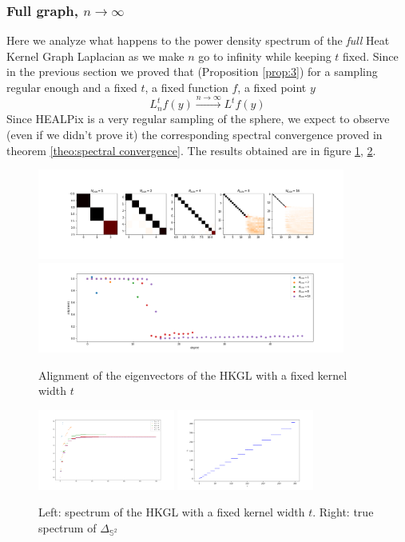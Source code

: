 \subsubsection{Full graph, $n\to\infty$}\label{sec:Chapter1: n to infty}
Here we analyze what happens to the power density spectrum of the \textit{full} Heat Kernel Graph Laplacian as we make $n$ go to infinity while keeping $t$ fixed. Since in the previous section we proved that (Proposition \ref{prop:3}) for a sampling regular enough and a fixed $t$, a fixed function $f$, a fixed point $y$
$$L_n^tf(y)\xrightarrow{n\to\infty}L^tf(y)$$
Since HEALPix is a very regular sampling of the sphere, we expect to observe (even if we didn't prove it) the corresponding spectral convergence proved in theorem \ref{theo:spectral convergence}. The results obtained are in figure \ref{fig:n to infinity1}, \ref{fig:n to infinity3}.

\begin{figure}[h!]
	\centering
	\includegraphics[width=0.9\textwidth]{../codes/02.HeatKernelGraphLaplacian/HEALPix/06_figures/n.png}
	\includegraphics[width=0.9\textwidth]{../codes/02.HeatKernelGraphLaplacian/HEALPix/06_figures/n_diagonal.png}	
	\caption{\label{fig:n to infinity1}Alignment of the eigenvectors of the HKGL with a fixed kernel width $t$}
	
\end{figure}
\begin{figure}[h!]
	\centering
	\includegraphics[width=0.4\textwidth]{../codes/02.HeatKernelGraphLaplacian/HEALPix/06_figures/n_eigenvalues.png}
		\includegraphics[width=0.4\textwidth]{figs/chapter1/trueeigenvalues.png}	
	\caption{\label{fig:n to infinity3}Left: spectrum of the HKGL with a fixed kernel width $t$. Right: true spectrum of $\Delta_{\mathbb S^2}$}
\end{figure}


